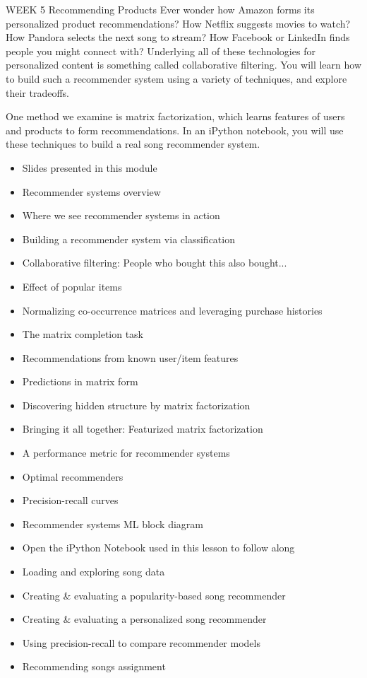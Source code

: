 WEEK 5
Recommending Products
Ever wonder how Amazon forms its personalized product recommendations? How Netflix suggests movies to watch? How Pandora selects the next song to stream? How Facebook or LinkedIn finds people you might connect with? Underlying all of these technologies for personalized content is something called collaborative filtering.
You will learn how to build such a recommender system using a variety of techniques, and explore their tradeoffs.

One method we examine is matrix factorization, which learns features of users and products to form recommendations. In an iPython notebook, you will use these techniques to build a real song recommender system.
\begin{itemize}
\item Slides presented in this module
\item Recommender systems overview
\item Where we see recommender systems in action
\item Building a recommender system via classification
\item Collaborative filtering: People who bought this also bought...
\item Effect of popular items
\item Normalizing co-occurrence matrices and leveraging purchase histories
\item The matrix completion task
\item Recommendations from known user/item features
\item Predictions in matrix form
\item Discovering hidden structure by matrix factorization
\item Bringing it all together: Featurized matrix factorization
\item A performance metric for recommender systems
\item Optimal recommenders
\item Precision-recall curves
\item Recommender systems ML block diagram
\item Open the iPython Notebook used in this lesson to follow along
\item Loading and exploring song data
\item Creating & evaluating a popularity-based song recommender
\item Creating & evaluating a personalized song recommender
\item Using precision-recall to compare recommender models
\item Recommending songs assignment
\end{itemize}
